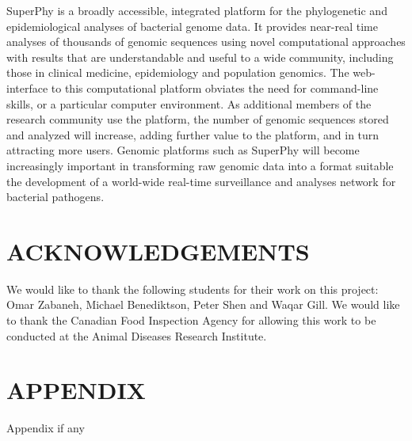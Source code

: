\documentclass[a4paper,twoside]{article}
\begin{document}
\noindent SuperPhy is a broadly accessible, integrated platform for the phylogenetic and epidemiological analyses of bacterial genome data. It provides near-real time analyses of thousands of genomic sequences using novel computational approaches with results that are understandable and useful to a wide community, including those in clinical medicine, epidemiology and population genomics. The web-interface to this computational platform obviates the need for command-line skills, or a particular computer environment. As additional members of the research community use the platform, the number of genomic sequences stored and analyzed will increase, adding further value to the platform, and in turn attracting more users. Genomic platforms such as SuperPhy will become increasingly important in transforming raw genomic data into a format suitable the development of a world-wide real-time surveillance and analyses network for bacterial pathogens.

\section*{\uppercase{Acknowledgements}}

\noindent We would like to thank the following students for their work on this project: Omar Zabaneh, Michael Benediktson, Peter Shen and Waqar Gill. We would like to thank the Canadian Food Inspection Agency for allowing this work to be conducted at the Animal Diseases Research Institute.


\vfill

{\small
}


\section*{\uppercase{Appendix}}

\noindent Appendix if any

\vfill
\end{document}
